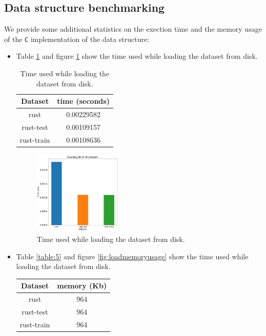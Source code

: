 \documentclass{acm_proc_article-sp}
\begin{document}
\subsection{Data structure benchmarking}
We provide some additional statistics on the exection time and the memory usage of the \texttt{C} implementation of the data structure:
\begin {itemize}
  \item Table \ref{table:4} and figure \ref{fig:loadingtime} show the time used while loading the dataset from disk.
  \begin{table}[h]
    \centering
    \begin{tabular}{|c|c|}
      \hline
      Dataset & time (seconds) \\ \hline
      rust       & 0.00229582 \\
      rust-test  & 0.00109157 \\
      rust-train & 0.00108636 \\ \hline
    \end{tabular}
    \caption{Time used while loading the dataset from disk.}
    \label{table:4}
  \end{table}
  \begin{figure}[h]
    \centering
    \includegraphics[width=0.4\textwidth]{loadtime}
    \caption{Time used while loading the dataset from disk.}
    \label{fig:loadingtime}
  \end{figure}
  \item Table \ref{table:5} and figure \ref{fig:loadmemoryusage} show the time used while loading the dataset from disk.
  \begin{table}[h]
    \centering
    \begin{tabular}{|c|c|}
      \hline
      Dataset & memory (Kb) \\ \hline
      rust       & 964 \\
      rust-test  & 964 \\
      rust-train & 964 \\ \hline
    \end{tabular}

\end{table}
\end{itemize}
\end{document}
